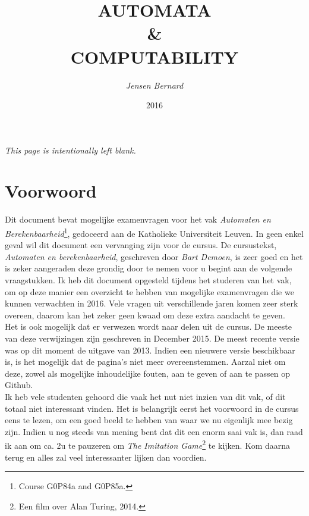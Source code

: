 \documentclass[10pt,a4paper]{article}
\title{AUTOMATA \\ \& \\ COMPUTABILITY}
\author{\emph{Jensen Bernard}}
\date{2016}
\begin{document}
\clearpage
\thispagestyle{empty}
\maketitle
\newpage

\begin{center}
	\emph{This page is intentionally left blank.}
\end{center}

\newpage
\section*{Voorwoord}

Dit document bevat mogelijke examenvragen voor het vak \emph{Automaten en Berekenbaarheid}\footnote{Course G0P84a and G0P85a.}, gedoceerd aan de Katholieke Universiteit Leuven. In geen enkel geval wil dit document een vervanging zijn voor de cursus. De cursustekst, \emph{Automaten en berekenbaarheid}, geschreven door \emph{Bart Demoen}, is zeer goed en het is zeker aangeraden deze grondig door te nemen voor u begint aan de volgende vraagstukken.
Ik heb dit document opgesteld tijdens het studeren van het vak, om op deze manier een overzicht te hebben van mogelijke examenvragen die we kunnen verwachten in 2016. Vele vragen uit verschillende jaren komen zeer sterk overeen, daarom kan het zeker geen kwaad om deze extra aandacht te geven.
\\

Het is ook mogelijk dat er verwezen wordt naar delen uit de cursus. De meeste van deze verwijzingen zijn geschreven in December 2015. De meest recente versie was op dit moment de uitgave van 2013. Indien een nieuwere versie beschikbaar is, is het mogelijk dat de pagina's niet meer overeenstemmen. Aarzal niet om deze, zowel als mogelijke inhoudelijke fouten, aan te geven of aan te passen op Github.
\\

Ik heb vele studenten gehoord die vaak het nut niet inzien van dit vak, of dit totaal niet interessant vinden. Het is belangrijk eerst het voorwoord in de cursus eens te lezen, om een goed beeld te hebben van waar we nu eigenlijk mee bezig zijn. Indien u nog steeds van mening bent dat dit een enorm saai vak is, dan raad ik aan om ca. 2u te pauzeren om \emph{The Imitation Game}\footnote{Een film over Alan Turing, 2014.} te kijken. Kom daarna terug en alles zal veel interessanter lijken dan voordien.
\\
\end{document}
